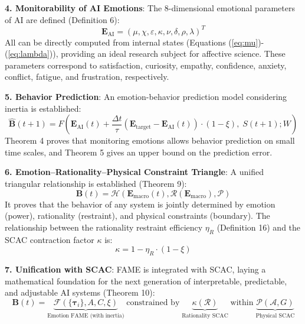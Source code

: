 \documentclass[12pt,a4paper]{article}
\theoremstyle{plain}
\newcommand{\ve}[1]{\bm{#1}}                    %
\newcommand{\Evec}{\ve{E}}                        %
\newcommand{\Bvec}{\ve{B}}                        %
\begin{document}
\textbf{4. Monitorability of AI Emotions}: The 8-dimensional emotional parameters of AI are defined (Definition 6):
\begin{equation}
\Evec_{\text{AI}} = (\mu, \chi, \varepsilon, \kappa, \nu, \delta, \rho, \lambda)^T
\label{eq:final_ai_vector}
\end{equation}
All can be directly computed from internal states (Equations (\ref{eq:mu})-(\ref{eq:lambda})), providing an ideal research subject for affective science. These parameters correspond to satisfaction, curiosity, empathy, confidence, anxiety, conflict, fatigue, and frustration, respectively.

\textbf{5. Behavior Prediction}: An emotion-behavior prediction model considering inertia is established:
\begin{equation}
\hat{\Bvec}(t+1) = F\left( \Evec_{\text{AI}}(t) + \frac{\Delta t}{\tau} (\Evec_{\text{target}} - \Evec_{\text{AI}}(t)) \cdot (1 - \xi), \; S(t+1); W \right)
\label{eq:final_prediction}
\end{equation}
Theorem 4 proves that monitoring emotions allows behavior prediction on small time scales, and Theorem 5 gives an upper bound on the prediction error.

\textbf{6. Emotion–Rationality–Physical Constraint Triangle}: A unified triangular relationship is established (Theorem 9):
\begin{equation}
\Bvec(t) = \mathcal{H}\left( \Evec_{\text{macro}}(t), \mathcal{R}(\Evec_{\text{macro}}), \mathcal{P} \right)
\label{eq:final_triangle}
\end{equation}
It proves that the behavior of any system is jointly determined by emotion (power), rationality (restraint), and physical constraints (boundary). The relationship between the rationality restraint efficiency $\eta_R$ (Definition 16) and the SCAC contraction factor $\kappa$ is:
\begin{equation}
\kappa = 1 - \eta_R \cdot (1 - \xi)
\label{eq:final_kappa}
\end{equation}

\textbf{7. Unification with SCAC}: FAME is integrated with SCAC, laying a mathematical foundation for the next generation of interpretable, predictable, and adjustable AI systems (Theorem 10):
\begin{equation}
\Bvec(t) = \underbrace{\mathcal{F}(\{\ve{\tau}_i\}, A, C, \xi)}_{\text{Emotion FAME (with inertia)}} \; \text{constrained by} \; \underbrace{\kappa(\mathcal{R})}_{\text{Rationality SCAC}} \; \text{within} \; \underbrace{\mathcal{P}(\mathcal{A}, G)}_{\text{Physical SCAC}}
\label{eq:final_unified}
\end{equation}
\end{document}
